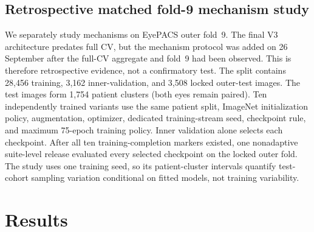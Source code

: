 \documentclass[10pt,twocolumn,letterpaper]{article}
\begin{document}
\subsection{Retrospective matched fold-9 mechanism study}
\label{sec:ablation-protocol}

We separately study mechanisms on EyePACS outer fold~9.  The final V3
architecture predates full CV, but the mechanism protocol was added on 26
September after the full-CV aggregate and fold~9 had been
observed.  This is therefore retrospective evidence, not a confirmatory test.
The split contains 28,456 training, 3,162
inner-validation, and 3,508 locked outer-test images.  The test images form
1,754 patient clusters (both eyes remain paired).  Ten independently trained
variants use the same patient split, ImageNet initialization policy,
augmentation, optimizer, dedicated training-stream seed, checkpoint rule, and
maximum 75-epoch training policy.  Inner validation alone selects each
checkpoint.  After all ten training-completion markers existed, one
nonadaptive suite-level release evaluated every selected checkpoint on the
locked outer fold.  The study uses one training seed, so its patient-cluster
intervals quantify test-cohort sampling variation conditional on fitted models,
not training variability.

\section{Results}
\label{sec:results}
\end{document}
